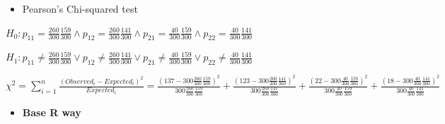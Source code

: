 \documentclass[
  ignorenonframetext,
]{beamer}
\newenvironment{Shaded}{\begin{snugshade}}{\end{snugshade}}
\newcommand{\AttributeTok}[1]{\textcolor[rgb]{0.40,0.45,0.13}{#1}}
\newcommand{\ConstantTok}[1]{\textcolor[rgb]{0.56,0.35,0.01}{#1}}
\newcommand{\FunctionTok}[1]{\textcolor[rgb]{0.28,0.35,0.67}{#1}}
\newcommand{\NormalTok}[1]{\textcolor[rgb]{0.00,0.23,0.31}{#1}}
\newcommand{\OtherTok}[1]{\textcolor[rgb]{0.00,0.23,0.31}{#1}}
\newcommand{\SpecialCharTok}[1]{\textcolor[rgb]{0.37,0.37,0.37}{#1}}
\providecommand{\tightlist}{%
  \setlength{\itemsep}{0pt}\setlength{\parskip}{0pt}}\usepackage{longtable,booktabs,array}
\begin{document}
\begin{frame}[fragile]{}
\label{section-7}
\begin{itemize}
\tightlist
\item
  Pearson's Chi-squared test
\end{itemize}

\(H_0: p_{11} = \frac{260}{300}\frac{159}{300} \land p_{12} = \frac{260}{300}\frac{141}{300} \land p_{21} = \frac{40}{300}\frac{159}{300} \land p_{22} = \frac{40}{300}\frac{141}{300}\)

\(H_1: p_{11} \neq \frac{260}{300}\frac{159}{300} \lor p_{12} \neq \frac{260}{300}\frac{141}{300} \lor p_{21} \neq \frac{40}{300}\frac{159}{300} \lor p_{22} \neq \frac{40}{300}\frac{141}{300}\)

\(\chi^2 = \sum_{i=1}^n \frac{(Observed_i - Expected_i)^2}{Expected_i} = \frac{(137 - 300\frac{260}{300}\frac{159}{300})^2}{300\frac{260}{300}\frac{159}{300}} + \frac{(123 - 300\frac{260}{300}\frac{141}{300})^2}{300\frac{260}{300}\frac{141}{300}} + \frac{(22 - 300\frac{40}{300}\frac{159}{300})^2}{300\frac{40}{300}\frac{159}{300}} + \frac{(18 - 300\frac{40}{300}\frac{141}{300})^2}{300\frac{40}{300}\frac{141}{300}}\)

\begin{itemize}
\tightlist
\item
  \textbf{Base R way}
\end{itemize}

\tiny

\begin{Shaded}
\end{Shaded}
\end{frame}
\end{document}
